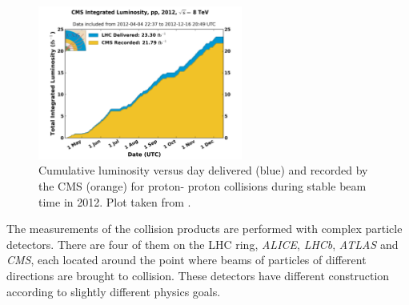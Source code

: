 \begin{figure}[t]
  \centering
  \includegraphics[width=0.6\textwidth]{02_experimental_setup/plots/int_lumi_per_day_cumulative_pp_2012.png}
  \caption{Cumulative luminosity versus day delivered (blue) and recorded by the CMS (orange) for proton-
  proton collisions during stable beam time in 2012. Plot taken from \cite{HHaber}.}
  \label{fig:LumiCMS}
\end{figure}



The measurements of the collision products are performed with complex particle detectors. There are four of them on the 
LHC ring, \textit{ALICE}, \textit{LHCb}, \textit{ATLAS} and \textit{CMS}, each located around the point where beams 
of particles of different directions are brought to collision.
These detectors have different construction according to slightly different physics goals.

